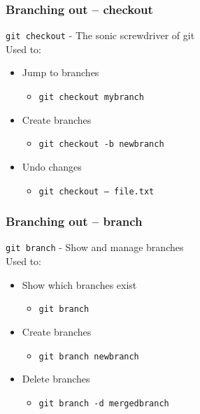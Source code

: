 \documentclass{beamer}
\begin{document}
\begin{frame}
  \frametitle{Branching out -- checkout}

    \texttt{git checkout} - The sonic screwdriver of git \\[1em]
    Used to:
    \begin{itemize}
        \item Jump to branches
        \begin{itemize}
            \item[] \texttt{git checkout mybranch}
        \end{itemize}
        \item Create branches
        \begin{itemize}
            \item[] \texttt{git checkout -b newbranch}
        \end{itemize}
        \item Undo changes
        \begin{itemize}
            \item[] \texttt{git checkout -- file.txt}
        \end{itemize}
    \end{itemize}

\end{frame}

\begin{frame}
  \frametitle{Branching out -- branch}

    \texttt{git branch} - Show and manage branches \\[1em]
    Used to:
    \begin{itemize}
        \item Show which branches exist
        \begin{itemize}
            \item[] \texttt{git branch}
        \end{itemize}
        \item Create branches
        \begin{itemize}
            \item[] \texttt{git branch newbranch}
        \end{itemize}
        \item Delete branches
        \begin{itemize}
            \item[] \texttt{git branch -d mergedbranch}
        \end{itemize}
    \end{itemize}
\end{frame}
\end{document}
